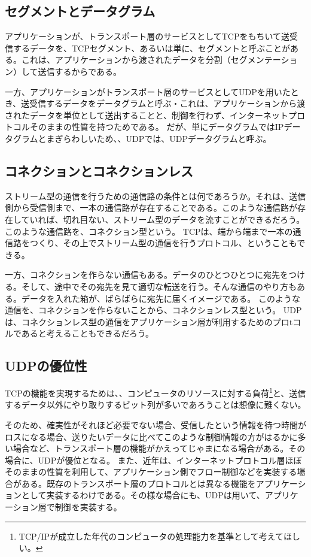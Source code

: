 \subsection{セグメントとデータグラム}
アプリケーションが、トランスポート層のサービスとしてTCPをもちいて送受信するデータを、TCPセグメント、あるいは単に、セグメントと呼ぶことがある。これは、アプリケーションから渡されたデータを分割（セグメンテーション）して送信するからである。

一方、アプリケーションがトランスポート層のサービスとしてUDPを用いたとき、送受信するデータをデータグラムと呼ぶ・これは、アプリケーションから渡されたデータを単位として送出することと、制御を行わず、インターネットプロトコルそのままの性質を持つためである。
だが、単にデータグラムではIPデータグラムとまぎらわしいため、、UDPでは、UDPデータグラムと呼ぶ。

\subsection{コネクションとコネクションレス}
ストリーム型の通信を行うための通信路の条件とは何であろうか。それは、送信側から受信側まで、一本の通信路が存在することである。このような通信路が存在していれば、切れ目ない、ストリーム型のデータを流すことができるだろう。このような通信路を、コネクション型という。
TCPは、端から端まで一本の通信路をつくり、その上でストリーム型の通信を行うプロトコル、ということもできる。

一方、コネクションを作らない通信もある。データのひとつひとつに宛先をつける。そして、途中でその宛先を見て適切な転送を行う。そんな通信のやり方もある。データを入れた箱が、ばらばらに宛先に届くイメージである。
このような通信を、コネクションを作らないことから、コネクションレス型という。
UDPは、コネクションレス型の通信をアプリケーション層が利用するためのプロtコルであると考えることもできるだろう。

\subsection{UDPの優位性}

TCPの機能を実現するためは、、コンピュータのリソースに対する負荷\footnote{TCP/IPが成立した年代のコンピュータの処理能力を基準として考えてほしい。}と、送信するデータ以外にやり取りするビット列が多いであろうことは想像に難くない。

そのため、確実性がそれほど必要でない場合、受信したという情報を待つ時間がロスになる場合、送りたいデータに比べてこのような制御情報の方がはるかに多い場合など、トランスポート層の機能がかえってじゃまになる場合がある。その場合に、UDPが優位となる。
また、近年は、インターネットプロトコル層ほぼそのままの性質を利用して、アプリケーション側でフロー制御などを実装する場合がある。既存のトランスポート層のプロトコルとは異なる機能をアプリケーションとして実装するわけである。その様な場合にも、UDPは用いて、アプリケーション層で制御を実装する。

